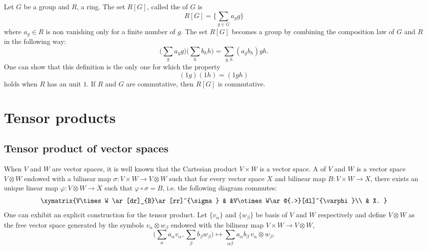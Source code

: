 Let $G$ be a group and $R$, a ring. The set $R[G]$, called the  of $G$ is
\begin{equation}
	R[G]=\{ \sum_{g\in G}a_gg \}
\end{equation}
where $a_g\in R$ is non vanishing only for a finite number of $g$. The set $R[G]$ becomes a group by combining the composition law of $G$ and $R$ in the following way:
\begin{equation}
	\Big( \sum_ga_gg \Big)\Big( \sum_hb_hh \Big)=\sum_{g,h}(a_gb_h)gh.
\end{equation}
One can show that this definition is the only one for which the property
\[
	(1g)(1h)=(1gh)
\]
holds when $R$ has an unit $1$.  If $R$ and $G$ are commutative, then $R[G]$ is commutative.

\section{Tensor products}

\subsection{Tensor product of vector spaces}

When $V$ and $W$ are vector spaces, it is well known that the Cartesian product $V\times W$ is a vector space. A  of $V$ and $W$ is a vector space $V\otimes W$ endowed with a bilinear map $\sigma\colon V\times W\to V\otimes W$ such that for every vector space $X$ and bilinear map $B\colon V\times W\to X$, there exists an unique linear map $\varphi\colon V\otimes W\to X$ such that $\varphi\circ\sigma=B$, i.e. the following diagram commutes:
\[
	\xymatrix{%
		V\times W \ar[dr]_{B}\ar[rr]^{\sigma}		&	&V\otimes W\ar@{.>}[dl]^{\varphi}\\
		&  X.
	}
\]
One can exhibit an explicit construction for the tensor product. Let $\{ v_{\alpha} \}$ and $\{ w_{\beta} \}$ be basis of $V$ and $W$ respectively and define $V\otimes W$ as the free vector space generated by the symbols $v_{\alpha}\otimes w_{\beta}$ endowed with the bilinear map $V\times W\to V\otimes W$,
\[
	\big( \sum_{\alpha} a_{\alpha} v_{\alpha},\sum_{\beta} b_{\beta}w_{\beta} \big)\mapsto\sum_{\alpha\beta} a_{\alpha}b_{\beta}\, v_{\alpha}\otimes w_{\beta}.
\]

